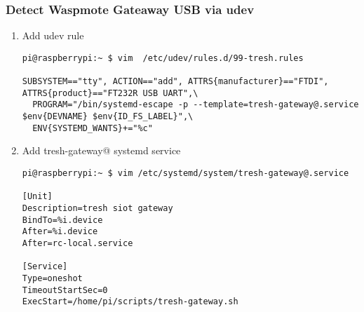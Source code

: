 \subsubsection*{Detect Waspmote Gateaway USB via
udev}\label{detect-waspmote-gateaway-usb-via-udev}

\begin{enumerate}
\def\labelenumi{\arabic{enumi}.}
\item
  Add udev rule

\begin{verbatim}
pi@raspberrypi:~ $ vim  /etc/udev/rules.d/99-tresh.rules

SUBSYSTEM=="tty", ACTION=="add", ATTRS{manufacturer}=="FTDI", ATTRS{product}=="FT232R USB UART",\
  PROGRAM="/bin/systemd-escape -p --template=tresh-gateway@.service $env{DEVNAME} $env{ID_FS_LABEL}",\
  ENV{SYSTEMD_WANTS}+="%c"
\end{verbatim}
\item
  Add tresh-gateway@ systemd service

\begin{verbatim}
pi@raspberrypi:~ $ vim /etc/systemd/system/tresh-gateway@.service

[Unit]
Description=tresh siot gateway
BindTo=%i.device
After=%i.device
After=rc-local.service

[Service]
Type=oneshot
TimeoutStartSec=0
ExecStart=/home/pi/scripts/tresh-gateway.sh
\end{verbatim}
\end{enumerate}
